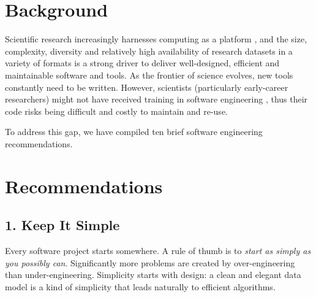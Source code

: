 \documentclass{bmcart}
\begin{document}


\section*{Background}

Scientific research increasingly harnesses computing as a platform \cite{goble2014}, and the size, complexity, diversity and relatively high availability of research datasets in a variety of formats is a strong driver to deliver well-designed, efficient and maintainable software and tools.
As the frontier of science evolves, new tools constantly need to be written. However, scientists (particularly early-career researchers) might not have received training in software engineering \cite{wilson2014bestpractice}, thus their code risks being difficult and costly to maintain and re-use. 

To address this gap, we have compiled ten brief software engineering recommendations. 

\section*{Recommendations}

\subsection*{1. Keep It Simple}

Every software project starts somewhere. A rule of thumb is to \textit{start as simply as you possibly can}. Significantly more problems are created by over-engineering than under-engineering. Simplicity starts with design: a clean and elegant data model is a kind of simplicity that leads naturally to efficient algorithms.  
 
\end{document}
